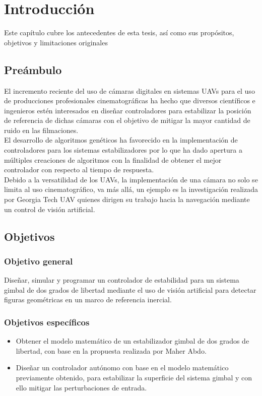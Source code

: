 \chapter{Introducci\'on}
 	Este capítulo cubre los antecedentes de esta tesis, así como sus propósitos, objetivos y limitaciones originales
\section{Preámbulo}
El incremento reciente del uso de cámaras digitales en sistemas UAVs para el uso de producciones profesionales cinematográficas ha hecho que diversos científicos e ingenieros estén interesados en diseñar controladores para estabilizar la posición de referencia de dichas cámaras con el objetivo de mitigar la mayor cantidad de ruido en las filmaciones.\\
El desarrollo de algoritmos genéticos ha favorecido en la implementación de controladores para los sistemas estabilizadores por lo que ha dado apertura a múltiples creaciones de algoritmos con la finalidad de obtener el mejor controlador con respecto al tiempo de respuesta. \\
Debido a la versatilidad de los UAVs, la implementación de una cámara no solo se limita al uso cinematográfico, va más allá, un ejemplo es la investigación realizada por Georgia Tech UAV quienes dirigen su trabajo hacia la navegación mediante un control de visión artificial.  

\section{Objetivos}
\subsection{Objetivo general}
Diseñar, simular y programar un controlador de estabilidad para un sistema gimbal de dos grados de libertad mediante el uso de visión artificial para detectar figuras geométricas en un marco de referencia inercial.
\subsection{Objetivos espec\'ificos}
\begin{itemize}
\item Obtener el modelo matemático de un estabilizador gimbal de dos grados de libertad, con base en la propuesta realizada por Maher Abdo.
\item Diseñar un controlador autónomo con base en el modelo matemático previamente obtenido, para estabilizar la superficie del sistema gimbal y con ello mitigar las perturbaciones de entrada. 
\end{itemize}

